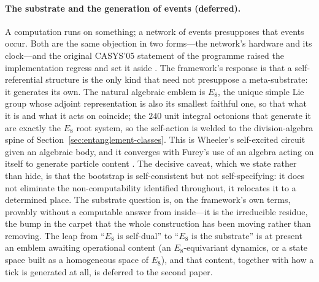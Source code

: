 \paragraph{The substrate and the generation of events (deferred).}
A computation runs on something; a network of events presupposes that events
occur. Both are the same objection in two forms---the network's hardware and its
clock---and the original CASYS'05 statement of the programme raised the
implementation regress and set it aside \autocite{small_2006}. The framework's
response is that a self-referential structure is the only kind that need not
presuppose a meta-substrate: it generates its own. The natural algebraic emblem
is $E_{8}$, the unique simple Lie group whose adjoint representation is also its
smallest faithful one, so that what it is and what it acts on coincide; the $240$
unit integral octonions that generate it are exactly the $E_{8}$ root system, so
the self-action is welded to the division-algebra spine of
Section~\ref{sec:entanglement-classes}. This is Wheeler's self-excited circuit
\autocite{Wheeler1990} given an algebraic body, and it converges with Furey's use
of an algebra acting on itself to generate particle content
\autocite{furey2018three}. The decisive caveat, which we state rather than hide, is
that the bootstrap is self-consistent but not self-specifying: it does not
eliminate the non-computability identified throughout, it relocates it to a
determined place. The substrate question is, on the framework's own terms,
provably without a computable answer from inside---it is the irreducible residue,
the bump in the carpet that the whole construction has been moving rather than
removing. The leap from ``$E_{8}$ is self-dual'' to ``$E_{8}$ is the substrate''
is at present an emblem awaiting operational content (an $E_{8}$-equivariant
dynamics, or a state space built as a homogeneous space of $E_{8}$), and that
content, together with how a tick is generated at all, is deferred to the second
paper.

